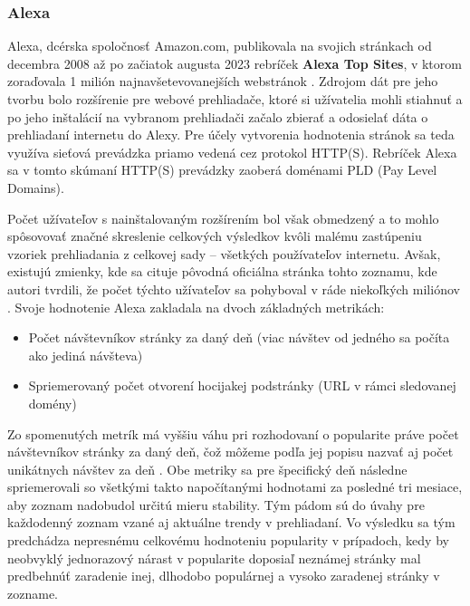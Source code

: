 \subsubsection{Alexa}

Alexa, dcérska spoločnosť Amazon.com, publikovala na svojich stránkach od decembra 2008 až po začiatok augusta 2023 rebríček \textbf{Alexa Top Sites}, v ktorom zoraďovala 1 milión 
najnavšetevovanejších webstránok \cite{tranco-methodology}.
Zdrojom dát pre jeho tvorbu bolo rozšírenie pre webové prehliadače, ktoré si užívatelia mohli stiahnuť a po jeho inštalácií na vybranom prehliadači začalo zbierať a odosielať
dáta o prehliadaní internetu do Alexy. 
Pre účely vytvorenia hodnotenia stránok sa teda využíva sieťová prevádzka priamo vedená cez protokol HTTP(S). 
Rebríček Alexa sa v tomto skúmaní HTTP(S) prevádzky zaoberá doménami PLD (Pay Level Domains). 

Počet užívateľov s nainštalovaným rozšírením bol však obmedzený 
a to mohlo spôsovovať značné skreslenie celkových výsledkov kvôli malému zastúpeniu vzoriek prehliadania z celkovej sady -- všetkých používateľov internetu. 
Avšak, existujú zmienky, kde sa cituje pôvodná oficiálna stránka tohto zoznamu, kde autori tvrdili, že počet týchto užívateľov sa pohyboval v ráde niekoľkých miliónov \cite{tranco}.
Svoje hodnotenie Alexa zakladala na dvoch základných metrikách: \cite{kinsta-alexa-rank-article, tranco}
\begin{itemize}
    \item Počet návštevníkov stránky za daný deň (viac návštev od jedného sa počíta ako jediná návšteva)
    \item Spriemerovaný počet otvorení hocijakej podstránky (URL v rámci sledovanej domény)
\end{itemize}

Zo spomenutých metrík má vyššiu váhu pri rozhodovaní o popularite práve počet návštevníkov stránky za daný deň, čož môžeme podľa jej popisu nazvať aj počet unikátnych návštev za deň \cite{tranco}.
Obe metriky sa pre špecifický deň následne spriemerovali so všetkými takto napočítanými hodnotami za posledné tri mesiace, aby zoznam nadobudol určitú mieru stability. 
Tým pádom sú do úvahy pre každodenný zoznam vzané aj aktuálne trendy v prehliadaní. Vo výsledku sa tým predchádza nepresnému celkovému hodnoteniu popularity v prípadoch, 
kedy by neobvyklý jednorazový nárast v popularite doposiaľ neznámej stránky mal predbehnúť zaradenie inej, dlhodobo populárnej a vysoko zaradenej stránky v zozname. 

